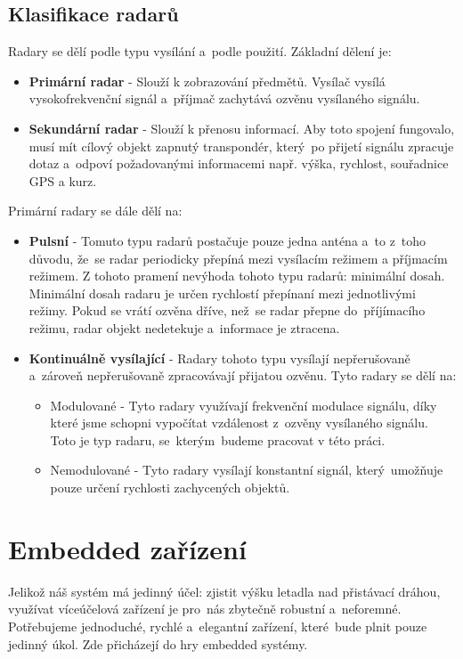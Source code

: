 		\subsection{Klasifikace radarů}
			Radary se dělí podle typu vysílání a~podle použití\cite{radarClasification}. Základní dělení je: 
			\begin{itemize}
				\item \textbf{Primární radar}	-	Slouží k zobrazování předmětů. Vysílač vysílá vysokofrekvenční signál a~příjmač zachytává ozvěnu vysílaného signálu.
					
				\item \textbf{Sekundární radar}	-	Slouží k přenosu informací. Aby toto spojení fungovalo, musí mít cílový objekt zapnutý transpondér, který~po přijetí signálu zpracuje dotaz a~odpoví požadovanými informacemi např. výška, rychlost, souřadnice GPS a kurz. 
			\end{itemize}
			
			Primární radary se dále dělí na:
			\begin{itemize}
				\item \textbf{Pulsní}	-	Tomuto typu radarů postačuje pouze jedna anténa a~to z~toho důvodu, že~se radar periodicky přepíná mezi vysílacím režimem a příjmacím režimem. Z tohoto pramení nevýhoda tohoto typu radarů: minimální dosah. Minimální dosah radaru je určen rychlostí přepínaní mezi jednotlivými režimy. Pokud se vrátí ozvěna dříve, než~se radar přepne do~příjímacího režimu, radar objekt nedetekuje a~informace je ztracena.
				
				\item \textbf{Kontinuálně vysílající}	-	Radary tohoto typu vysílají nepřerušovaně a~zároveň nepřerušovaně zpracovávají přijatou ozvěnu. Tyto radary se dělí na:
					\begin{itemize}
						\item Modulované - Tyto radary využívají frekvenční modulace signálu, díky které jsme schopni vypočítat vzdálenost z~ozvěny vysílaného signálu. Toto je typ radaru, se~kterým~budeme pracovat v této práci.
						
						\item Nemodulované - Tyto radary vysílají konstantní signál, který~umožňuje pouze určení rychlosti zachycených objektů.
					\end{itemize}
			\end{itemize}
		
		\section{Embedded zařízení}
			Jelikož náš systém má jedinný účel: zjistit výšku letadla nad přistávací dráhou, využívat víceúčelová zařízení je pro~nás zbytečně robustní a~neforemné. Potřebujeme jednoduché, rychlé a~elegantní zařízení, které~bude plnit pouze jedinný úkol. Zde přicházejí do hry embedded systémy.
			
